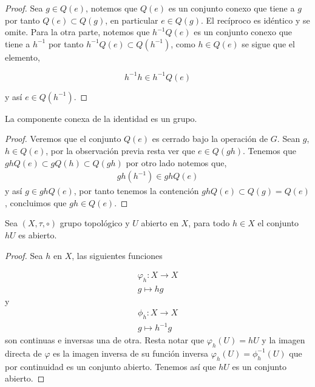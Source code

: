 \begin{proof}
 Sea $g \in Q(e)$, notemos que $Q(e)$ es un conjunto conexo que tiene a $g$ por tanto $Q(e) \subset Q(g)$, en particular $e \in Q(g).$ El recíproco es idéntico y se omite. Para la otra parte, notemos que $h^{-1}Q(e)$ es un conjunto conexo que tiene a $h^{-1}$ por tanto $h^{-1}Q(e) \subset Q(h^{-1})$, como $h \in Q(e)$ se sigue que el elemento,

$$h^{-1}h \in h^{-1}Q(e)$$

y así $e \in Q(h^{-1})$.  
\end{proof}

\begin{lm}\label{lm:Q(e) es grupo}
La componente conexa de la identidad es un grupo.
\end{lm}


\begin{proof}
 Veremos que el conjunto $Q(e)$ es cerrado bajo la operación de $G$. Sean $g$, $h \in Q(e)$, por la observación previa resta ver que $e \in Q(gh)$. Tenemos que $ ghQ(e) \subset gQ(h) \subset Q(gh)$ por otro lado notemos que, 
 \begin{align*}
 gh(h^{-1}) \in  ghQ(e)
 \end{align*}
 y así $g \in ghQ(e)$, por tanto tenemos la contención $ghQ(e) \subset Q(g)=Q(e)$, concluimos que $gh \in Q(e).$
 \end{proof}	
	
	
	
\begin{lm}\label{lm:gU_es_abierto}
Sea $(X,\tau, \circ)$ grupo topológico y $U$ abierto en $X$, para todo $h \in X$ el conjunto $hU$ es abierto.
\end{lm}

\begin{proof}
Sea $h$ en $X$, las siguientes funciones

\begin{align*}
\varphi_h:X \to X \\
g \mapsto hg
\end{align*}
y 
\begin{align*}
\phi_h:X \to X \\
g \mapsto h^{-1}g
\end{align*}
 son continuas e inversas una de otra. Resta notar que $\varphi_h(U)=hU$ y  la imagen directa de $\varphi$ es la imagen inversa de su función inversa  $\varphi_h(U)=\phi_h^{-1}(U)$ que por continuidad es un conjunto abierto.  Tenemos así que $hU$ es un conjunto abierto.

\end{proof}

